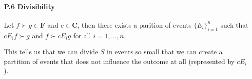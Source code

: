 \documentclass[landscape, 12pt]{extarticle}
\begin{document}
\begin{multicols}{2}
	\paragraph{P.6 Divisibility}
	Let $f \succ g \in \bm F$ and $c \in \bm C$,
	then there exists a parition of events $\{E_i\}^n_{i=1}$
	such that $cE_if \succ g$ and $f \succ cE_ig$ for all $i=1,\dots,n$.

	This tells us that we can divide $S$ in events so small that we can create
	a partition of events that does not influence the outcome at all (represented by $cE_i$).


\end{multicols}
\end{document}
